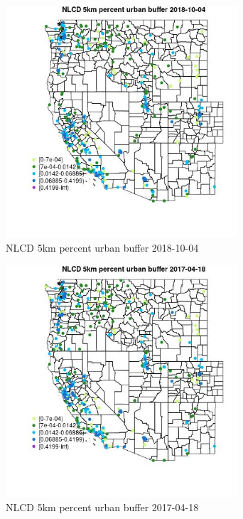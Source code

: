 \begin{figure} 
\centering  
\includegraphics[width=0.77\textwidth]{Code_Outputs/Report_ML_input_PM25_Step4_part_f_de_duplicated_aves_prioritize_24hr_obswNAs_MapObsNLCD_5km_percent_urban_buffer2018-10-04.jpg} 
\caption{\label{fig:Report_ML_input_PM25_Step4_part_f_de_duplicated_aves_prioritize_24hr_obswNAsMapObsNLCD_5km_percent_urban_buffer2018-10-04}NLCD 5km percent urban buffer 2018-10-04} 
\end{figure} 
 

\clearpage 

\begin{figure} 
\centering  
\includegraphics[width=0.77\textwidth]{Code_Outputs/Report_ML_input_PM25_Step4_part_f_de_duplicated_aves_prioritize_24hr_obswNAs_MapObsNLCD_5km_percent_urban_buffer2017-04-18.jpg} 
\caption{\label{fig:Report_ML_input_PM25_Step4_part_f_de_duplicated_aves_prioritize_24hr_obswNAsMapObsNLCD_5km_percent_urban_buffer2017-04-18}NLCD 5km percent urban buffer 2017-04-18} 
\end{figure} 
 

